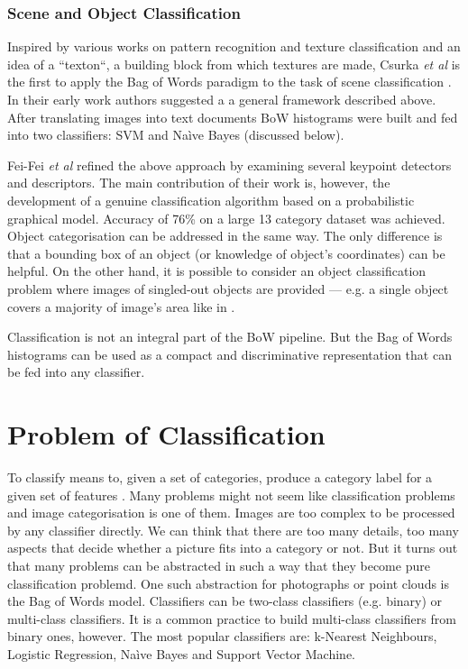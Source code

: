 		\subsubsection{Scene and Object Classification}
		Inspired by various works on pattern recognition and texture classification and an idea of a ``texton``, a building block from which textures are made, Csurka \emph{et al} is the first to apply the Bag of Words paradigm to the task of scene classification \cite{csurka2004visual}. In their early work authors suggested a a general framework described above. After translating images into text documents BoW histograms were built and fed into two classifiers: SVM and Na\`ive Bayes (discussed below). 		

		Fei-Fei \emph{et al} refined the above approach by examining several keypoint detectors and descriptors. The main contribution of their work is, however, the development of a genuine classification algorithm based on a probabilistic graphical model. Accuracy of 76\% on a large 13 category dataset was achieved.
		Object categorisation can be addressed in the same way. The only difference is that a bounding box of an object (or knowledge of object's coordinates) can be helpful. On the other hand, it is possible to consider an object classification problem where images of singled-out objects are provided --- e.g. a single object covers a majority of image's area like in \cite{zhangcategory}.

		Classification is not an integral part of the BoW pipeline. But the Bag of Words histograms can be used as a compact and discriminative representation that can be fed into any classifier.
		
\section{Problem of Classification}

	
	To classify means to, given a set of categories, produce a category label for a given set of features \cite{ponce2011cv}. Many problems might not seem like classification problems and image categorisation is one of them. Images are too complex to be processed by any classifier directly. We can think that there are too many details, too many aspects that decide whether a picture fits into a category or not. But it turns out that many problems can be abstracted in such a way that they become pure classification problemd. One such abstraction for photographs or point clouds is the Bag of Words model. Classifiers can be two-class classifiers (e.g. binary) or multi-class classifiers. It is a common practice to build multi-class classifiers from binary ones, however. The most popular classifiers are: k-Nearest Neighbours, Logistic Regression, Na\`ive Bayes and Support Vector Machine.
	
